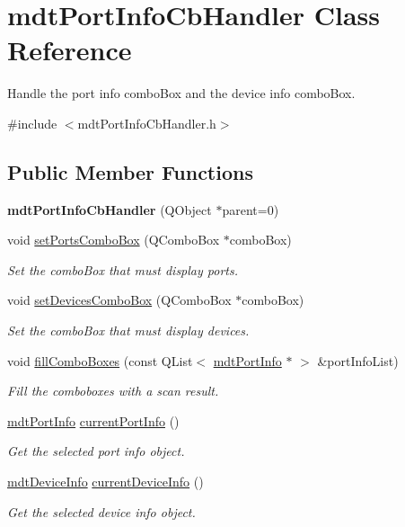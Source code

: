 \hypertarget{classmdt_port_info_cb_handler}{
\section{mdtPortInfoCbHandler Class Reference}
\label{classmdt_port_info_cb_handler}
}


Handle the port info comboBox and the device info comboBox.  




{\ttfamily \#include $<$mdtPortInfoCbHandler.h$>$}

\subsection*{Public Member Functions}
\begin{DoxyCompactItemize}
\item 
\hypertarget{classmdt_port_info_cb_handler_a1495b2c7f83722aaef8b244604284b51}{
{\bfseries mdtPortInfoCbHandler} (QObject $\ast$parent=0)}
\label{classmdt_port_info_cb_handler_a1495b2c7f83722aaef8b244604284b51}

\item 
void \hyperlink{classmdt_port_info_cb_handler_a06f9b5e8127e61026911691827f3203a}{setPortsComboBox} (QComboBox $\ast$comboBox)
\begin{DoxyCompactList}\small\item\em Set the comboBox that must display ports. \end{DoxyCompactList}\item 
void \hyperlink{classmdt_port_info_cb_handler_a59fc2180a69119e17cfa24cf84a9c96f}{setDevicesComboBox} (QComboBox $\ast$comboBox)
\begin{DoxyCompactList}\small\item\em Set the comboBox that must display devices. \end{DoxyCompactList}\item 
void \hyperlink{classmdt_port_info_cb_handler_a82c84a3eb52cd5d941377a64788a28ef}{fillComboBoxes} (const QList$<$ \hyperlink{classmdt_port_info}{mdtPortInfo} $\ast$ $>$ \&portInfoList)
\begin{DoxyCompactList}\small\item\em Fill the comboboxes with a scan result. \end{DoxyCompactList}\item 
\hyperlink{classmdt_port_info}{mdtPortInfo} \hyperlink{classmdt_port_info_cb_handler_a5723df72c4f1eda572c04e377dde9351}{currentPortInfo} ()
\begin{DoxyCompactList}\small\item\em Get the selected port info object. \end{DoxyCompactList}\item 
\hyperlink{classmdt_device_info}{mdtDeviceInfo} \hyperlink{classmdt_port_info_cb_handler_a266598f7f403e21730ff5ee50e6a6e5f}{currentDeviceInfo} ()
\begin{DoxyCompactList}\small\item\em Get the selected device info object. \end{DoxyCompactList}\end{DoxyCompactItemize}


